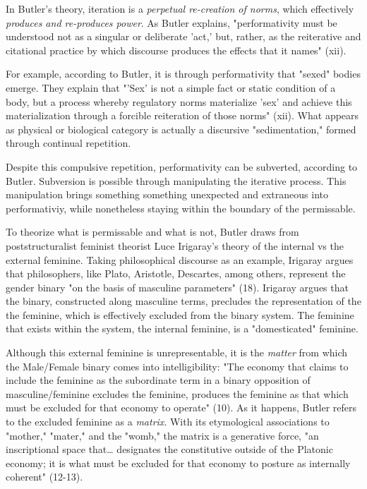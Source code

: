 \documentclass[11pt]{article}
\begin{document}
In Butler's theory, iteration is a \emph{perpetual re-creation of norms},
which effectively \emph{produces and re-produces power}. As Butler
explains, "performativity must be understood not as a singular or
deliberate 'act,' but, rather, as the reiterative and citational
practice by which discourse produces the effects that it names" (xii).

For example, according to Butler, it is through performativity that
"sexed" bodies emerge. They explain that "'Sex' is not a simple fact
or static condition of a body, but a process whereby regulatory norms
materialize 'sex' and achieve this materialization through a forcible
reiteration of those norms" (xii). What appears as physical or
biological category is actually a discursive "sedimentation," formed
through continual repetition.

Despite this compulsive repetition, performativity can be subverted,
according to Butler. Subversion is possible through manipulating the
iterative process. This manipulation brings something something
unexpected and extraneous into performativiy, while nonetheless
staying within the boundary of the permissable.


To theorize what is permissable and what is not, Butler draws from
poststructuralist feminist theorist Luce Irigaray's theory of the
internal vs the external feminine. Taking philosophical discourse as
an example, Irigaray argues that philosophers, like Plato, Aristotle,
Descartes, among others, represent the gender binary "on the basis of
masculine parameters" (18). Irigaray argues that the binary,
constructed along masculine terms, precludes the representation of the
the feminine, which is effectively excluded from the binary system.
The feminine that exists within the system, the internal feminine, is
a "domesticated" feminine.

Although this external feminine is unrepresentable, it is the \emph{matter}
from which the Male/Female binary comes into intelligibility: "The
economy that claims to include the feminine as the subordinate term in
a binary opposition of masculine/feminine excludes the feminine,
produces the feminine as that which must be excluded for that economy
to operate" (10). As it happens, Butler refers to the excluded
feminine as a \emph{matrix}. With its etymological associations to
"mother," "mater," and the "womb," the matrix is a generative force,
"an inscriptional space that\ldots{} designates the constitutive outside of
the Platonic economy; it is what must be excluded for that economy to
posture as internally coherent" (12-13).
\end{document}
